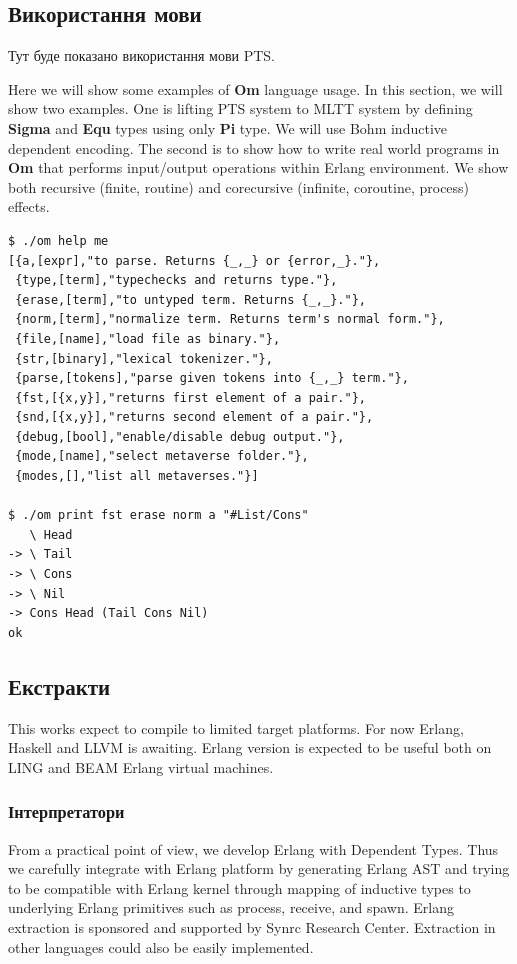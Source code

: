 \begin{definition}
\begin{definition}
\begin{definition}
\begin{definition}
\subsection{Використання мови}
Тут буде показано використання мови PTS.

Here we will show some examples of {\bf Om} language usage.
In this section, we will show two examples.
One is lifting PTS system to MLTT system by defining {\bf Sigma} and {\bf Equ} types using only {\bf Pi} type.
We will use Bohm inductive dependent encoding\cite{Bohm85}.
The second is to show how to write real world programs in {\bf Om} that performs input/output operations within Erlang environment.
We show both recursive (finite, routine) and corecursive (infinite, coroutine, process) effects.

\begin{lstlisting}
$ ./om help me
[{a,[expr],"to parse. Returns {_,_} or {error,_}."},
 {type,[term],"typechecks and returns type."},
 {erase,[term],"to untyped term. Returns {_,_}."},
 {norm,[term],"normalize term. Returns term's normal form."},
 {file,[name],"load file as binary."},
 {str,[binary],"lexical tokenizer."},
 {parse,[tokens],"parse given tokens into {_,_} term."},
 {fst,[{x,y}],"returns first element of a pair."},
 {snd,[{x,y}],"returns second element of a pair."},
 {debug,[bool],"enable/disable debug output."},
 {mode,[name],"select metaverse folder."},
 {modes,[],"list all metaverses."}]

$ ./om print fst erase norm a "#List/Cons"
   \ Head
-> \ Tail
-> \ Cons
-> \ Nil
-> Cons Head (Tail Cons Nil)
ok
\end{lstlisting}

\subsection{Екстракти}

This works expect to compile to limited target platforms. For now Erlang, Haskell and LLVM is awaiting.
Erlang version is expected to be useful both on LING and BEAM Erlang virtual machines.

\subsubsection{Інтерпретатори}

From a practical point of view, we develop Erlang with Dependent Types.
Thus we carefully integrate with Erlang platform by generating Erlang
AST and trying to be compatible with Erlang kernel through mapping of
inductive types to underlying Erlang primitives such as process,
receive, and spawn. Erlang extraction is sponsored and supported
by Synrc Research Center. Extraction in other languages could also be easily implemented.


\end{definition}
\end{definition}
\end{definition}
\end{definition}
